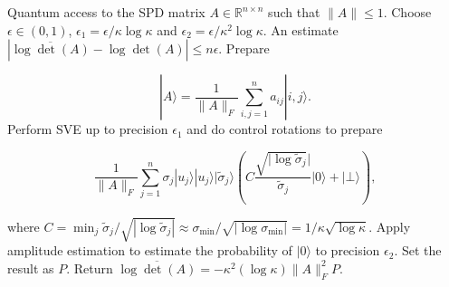 \documentclass{article}
\begin{document}
\pagestyle{empty} 

\begin{algorithm}
\begin{algorithmic}[1]
\Require
Quantum access to the SPD matrix $A \in \mathbb{R}^{n \times n}$ such that $\|A\| \leq 1$. Choose $\epsilon \in (0,1)$,
$\epsilon_1=\epsilon/\kappa\log \kappa$
and $\epsilon_2=\epsilon/\kappa^2\log \kappa$.
\Ensure
An estimate $|\overline{\log\det(A)}-\log\det(A)| \leq n\epsilon$.
\State Prepare

$$|A\rangle = \frac{1}{\|A\|_F} \sum_{i,j=1}^n a_{ij}|i,j\rangle.$$
\State Perform SVE up to precision $\epsilon_1$ and do control rotations to prepare

$$\frac{1}{\|A\|_F} \sum_{j=1}^n \sigma_j |u_j\rangle|u_j\rangle|\tilde{\sigma}_j\rangle
\left(C\frac{\sqrt{|\log \tilde{\sigma}_j}|}{\tilde{\sigma}_j} |0\rangle + |\bot\rangle\right),$$

where
$C=\min_j \tilde{\sigma}_j/\sqrt{|\log \tilde{\sigma}_j|} \approx \sigma_{\min}/\sqrt{|\log \sigma_{\min}|}
=1/\kappa\sqrt{\log \kappa}$.
\State Apply  amplitude estimation to estimate the probability
of $|0\rangle$ to precision
$\epsilon_2$. Set the result as $P$.
\State  Return $\overline{\log\det(A)}=-\kappa^2(\log \kappa)\|A\|_F^2P$.
\end{algorithmic}
\end{algorithm}
\end{document}
